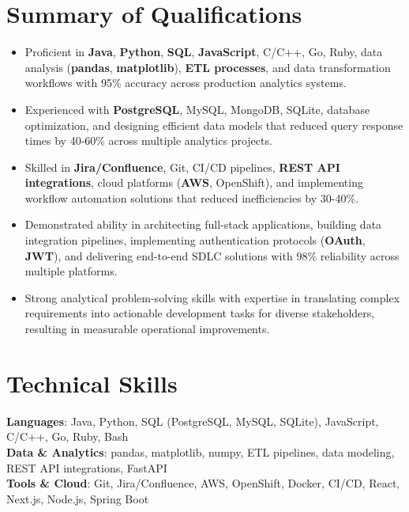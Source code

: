 \documentclass[letterpaper,10pt]{article}
\newcommand{\resumeItem}[1]{
  \item\small{
    {#1 \vspace{-2pt}}
  }
}
\begin{document}
\section{Summary of Qualifications}
 \begin{itemize}[leftmargin=0.0in, label={}]
        \resumeItem{Proficient in \textbf{Java}, \textbf{Python}, \textbf{SQL}, \textbf{JavaScript}, C/C++, Go, Ruby, data analysis (\textbf{pandas}, \textbf{matplotlib}), \textbf{ETL processes}, and data transformation workflows with 95\% accuracy across production analytics systems.}
        \resumeItem{Experienced with \textbf{PostgreSQL}, MySQL, MongoDB, SQLite, database optimization, and designing efficient data models that reduced query response times by 40-60\% across multiple analytics projects.}
        \resumeItem{Skilled in \textbf{Jira/Confluence}, Git, CI/CD pipelines, \textbf{REST API integrations}, cloud platforms (\textbf{AWS}, OpenShift), and implementing workflow automation solutions that reduced inefficiencies by 30-40\%.}
        \resumeItem{Demonstrated ability in architecting full-stack applications, building data integration pipelines, implementing authentication protocols (\textbf{OAuth}, \textbf{JWT}), and delivering end-to-end SDLC solutions with 98\% reliability across multiple platforms.}
        \resumeItem{Strong analytical problem-solving skills with expertise in translating complex requirements into actionable development tasks for diverse stakeholders, resulting in measurable operational improvements.}
 \end{itemize}

\vspace{-15pt}%
\section{Technical Skills}
 \begin{itemize}[leftmargin=0.15in, label={}]
    \small{\item{
     \textbf{Languages}{: Java, Python, SQL (PostgreSQL, MySQL, SQLite), JavaScript, C/C++, Go, Ruby, Bash} \\
     \textbf{Data \& Analytics}{: pandas, matplotlib, numpy, ETL pipelines, data modeling, REST API integrations, FastAPI} \\
     \textbf{Tools \& Cloud}{: Git, Jira/Confluence, AWS, OpenShift, Docker, CI/CD, React, Next.js, Node.js, Spring Boot}
    }}
 \end{itemize}
\end{document}
